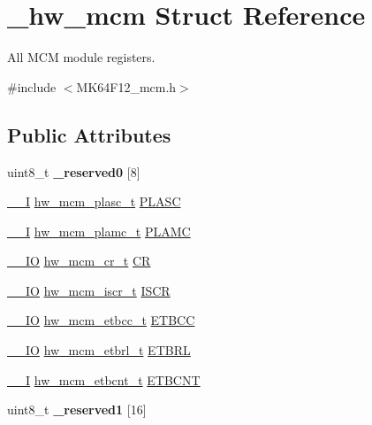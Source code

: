 \hypertarget{struct__hw__mcm}{}\section{\+\_\+hw\+\_\+mcm Struct Reference}
\label{struct__hw__mcm}


All M\+CM module registers.  




{\ttfamily \#include $<$M\+K64\+F12\+\_\+mcm.\+h$>$}

\subsection*{Public Attributes}
\begin{DoxyCompactItemize}
\item 
uint8\+\_\+t {\bfseries \+\_\+reserved0} \mbox{[}8\mbox{]}\hypertarget{struct__hw__mcm_a92787da0997688914100f35aac366728}{}\label{struct__hw__mcm_a92787da0997688914100f35aac366728}

\item 
\hyperlink{core__sc300_8h_af63697ed9952cc71e1225efe205f6cd3}{\+\_\+\+\_\+I} \hyperlink{union__hw__mcm__plasc}{hw\+\_\+mcm\+\_\+plasc\+\_\+t} \hyperlink{struct__hw__mcm_ab2a19c143794d39a2229b3df90b540ac}{P\+L\+A\+SC}
\item 
\hyperlink{core__sc300_8h_af63697ed9952cc71e1225efe205f6cd3}{\+\_\+\+\_\+I} \hyperlink{union__hw__mcm__plamc}{hw\+\_\+mcm\+\_\+plamc\+\_\+t} \hyperlink{struct__hw__mcm_a4e079f3fd83c37f73d324e6ff6dcde17}{P\+L\+A\+MC}
\item 
\hyperlink{core__sc300_8h_aec43007d9998a0a0e01faede4133d6be}{\+\_\+\+\_\+\+IO} \hyperlink{union__hw__mcm__cr}{hw\+\_\+mcm\+\_\+cr\+\_\+t} \hyperlink{struct__hw__mcm_a8d7d6eab73eb82ceaa97e4e45111b141}{CR}
\item 
\hyperlink{core__sc300_8h_aec43007d9998a0a0e01faede4133d6be}{\+\_\+\+\_\+\+IO} \hyperlink{union__hw__mcm__iscr}{hw\+\_\+mcm\+\_\+iscr\+\_\+t} \hyperlink{struct__hw__mcm_a310f77d82632d377ce7ea9567acd147f}{I\+S\+CR}
\item 
\hyperlink{core__sc300_8h_aec43007d9998a0a0e01faede4133d6be}{\+\_\+\+\_\+\+IO} \hyperlink{union__hw__mcm__etbcc}{hw\+\_\+mcm\+\_\+etbcc\+\_\+t} \hyperlink{struct__hw__mcm_a90356afbefdcbceef2f39f0fe03737af}{E\+T\+B\+CC}
\item 
\hyperlink{core__sc300_8h_aec43007d9998a0a0e01faede4133d6be}{\+\_\+\+\_\+\+IO} \hyperlink{union__hw__mcm__etbrl}{hw\+\_\+mcm\+\_\+etbrl\+\_\+t} \hyperlink{struct__hw__mcm_ae5c97c5ce711df944d6ad5faaec4ceb7}{E\+T\+B\+RL}
\item 
\hyperlink{core__sc300_8h_af63697ed9952cc71e1225efe205f6cd3}{\+\_\+\+\_\+I} \hyperlink{union__hw__mcm__etbcnt}{hw\+\_\+mcm\+\_\+etbcnt\+\_\+t} \hyperlink{struct__hw__mcm_a8fb53896a3eef0950171f7be2e0d7e11}{E\+T\+B\+C\+NT}
\item 
uint8\+\_\+t {\bfseries \+\_\+reserved1} \mbox{[}16\mbox{]}\hypertarget{struct__hw__mcm_a91eb60c086443fc439a3da4580f98c9d}{}\label{struct__hw__mcm_a91eb60c086443fc439a3da4580f98c9d}


\end{DoxyCompactItemize}
